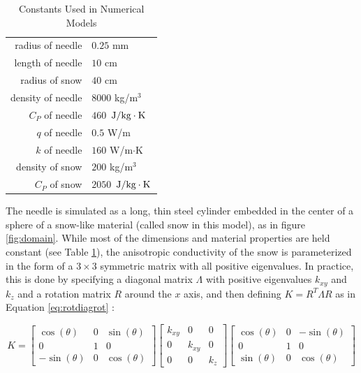 \begin{table}[h]
\centering
\caption{Constants Used in Numerical Models}
\begin{tabular}{r | l}
radius of needle & \(0.25\) mm\\
length of needle & \(10\) cm\\
radius of snow & \(40\) cm\\
\hline
density of needle & \(8000\) kg/\(\textrm{m}^3\)\\
\(C_P\) of needle & \(460\) \(\left.{\textrm{J}}\middle/{\textrm{kg}\cdot\textrm{K}}\right.\) \\
\(q\) of needle & \(0.5\) W/m\\
\(k\) of needle & \(160\) W/m\(\cdot\)K\\
\hline
density of snow & \(200\) kg/\(\textrm{m}^3\)\\
\(C_P\) of snow & \(2050\)  \(\left.{\textrm{J}}\middle/{\textrm{kg}\cdot\textrm{K}}\right.\)
\end{tabular}
\label{tab:constants}
\end{table}

The needle is simulated as a long, thin steel cylinder embedded in the center
of a sphere of a snow-like material (called snow in this model), as in figure \ref{fig:domain}. While most of the dimensions
and material properties are held constant (see Table \ref{tab:constants}), the
anisotropic conductivity of the snow is parameterized in the form
of a  \(3\times3\) symmetric matrix with all positive eigenvalues.  In practice, this is
done by specifying a diagonal matrix \(\Lambda\) with positive eigenvalues
\(k_{xy}\) and \(k_z\) and a rotation matrix \(R\) around the \(x\) axis, and
then defining \(K = R^T\Lambda R\) as in Equation \ref{eq:rotdiagrot} :

\begin{equation}
\label{eq:rotdiagrot}
K = \begin{bmatrix}
\cos(\theta) & 0 & \sin(\theta)\\
0 & 1 & 0\\
-\sin(\theta) & 0 &\cos(\theta)
\end{bmatrix}
\begin{bmatrix}
k_{xy} & 0 & 0\\
0 & k_{xy} & 0\\
0 & 0 & k_z
\end{bmatrix}
\begin{bmatrix}
\cos(\theta) & 0 & -\sin(\theta)\\
0 & 1 & 0\\
\sin(\theta) & 0 &\cos(\theta)
\end{bmatrix}
\end{equation}

